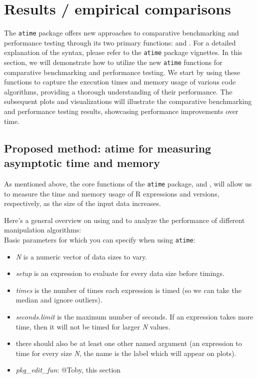 \vspace{0.1in}



\section{Results / empirical comparisons}

\noindent The \texttt{atime} package offers new approaches to comparative benchmarking and performance testing through its two primary functions:  and . For a detailed explanation of the syntax, please refer to the \texttt{atime} package vignettes. In this section, we will demonstrate how to utilize the new \texttt{atime} functions for comparative benchmarking and performance testing. We start by using these functions to capture the execution times and memory usage of various code algorithms, providing a thorough understanding of their performance. The subsequent plots and visualizations will illustrate the comparative benchmarking and performance testing results, showcasing performance improvements over time.\\


\subsection{Proposed method: atime for measuring asymptotic time and memory}

\noindent As mentioned above, the core functions of the \texttt{atime} package,  and , will allow us to measure the time and memory usage of R expressions and versions, respectively, as the size of the input data increases.

\noindent Here's a general overview on using  and  to analyze the performance of different manipulation algorithms:\\

\noindent Basic parameters for which you can specify when using \texttt{atime}:

\begin{itemize}
 \item \textit{N} is a numeric vector of data sizes to vary.
  \item \textit{setup} is an expression to evaluate for every data size before timings.
  \item \textit{times} is the number of times each expression is timed (so we can take the median and ignore outliers).
  \item \textit{seconds.limit} is the maximum number of seconds. If an expression takes more time, then it will not be timed for larger \textit{N} values.
  \item there should also be at least one other named argument (an expression to time for every size \textit{N}, the name is the label which will appear on plots).
  \item \textit{pkg\_edit\_fun}: @Toby, this section

\end{itemize}

